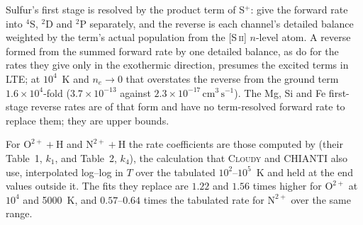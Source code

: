 \documentclass[twocolumn,linenumbers]{aastex702}
\newcommand{\cmc}{\mathrm{cm^{3}\,s^{-1}}}
\begin{document}
Sulfur's first stage is resolved by the product term of S$^+$: \citet{zhao2005}
give the forward rate into $^4$S, $^2$D and $^2$P separately, and the reverse
is each channel's detailed balance weighted by the term's actual population
from the [S\,\textsc{ii}] $n$-level atom.  A reverse formed from the summed
forward rate by one detailed balance, as \citet{huang2023} do for the rates
they give only in the exothermic direction, presumes the excited terms in
LTE; at $10^4$~K and $n_e\rightarrow0$ that overstates the reverse from the
ground term $1.6{\times}10^4$-fold ($3.7{\times}10^{-13}$ against
$2.3{\times}10^{-17}\,\cmc$).  The Mg, Si and Fe first-stage reverse rates
are of that form and have no term-resolved forward rate to replace them;
they are upper bounds.

For $\mathrm{O}^{2+} + \mathrm{H}$ and $\mathrm{N}^{2+} + \mathrm{H}$ the
rate coefficients are those computed by \citet{barragan2006} (their
Table~1, $k_1$, and Table~2, $k_4$), the calculation that \textsc{Cloudy}
and CHIANTI also use, interpolated log--log in $T$ over the tabulated
$10^2$--$10^5$~K and held at the end values outside it.  The
\citet{kingdon1996} fits they replace are $1.22$ and $1.56$ times higher for
$\mathrm{O}^{2+}$ at $10^4$ and 5000~K, and $0.57$--$0.64$ times the
tabulated rate for $\mathrm{N}^{2+}$ over the same range.
\end{document}
